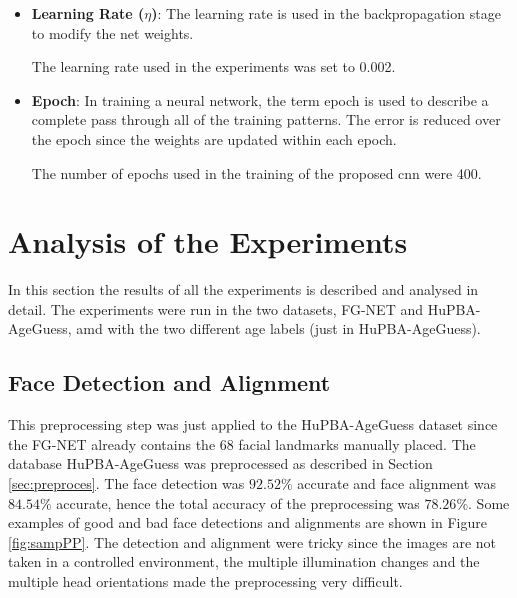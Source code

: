 \begin{itemize}
	\item \textbf{Learning Rate ($\eta $)}: The learning rate is used in the backpropagation stage to modify the net weights.
	
	The learning rate used in the experiments was set to 0.002. 
	
	\item \textbf{Epoch}: In training a neural network, the term epoch is used to describe a complete pass through all of the training patterns. The error is reduced over the epoch since the weights are updated within each epoch.
	
	The number of epochs used in the training of the proposed \gls{cnn} were 400.
\end{itemize}

\section{Analysis of the Experiments}







In this section the results of all the experiments is described and analysed in detail. The experiments were run in the two datasets, FG-NET and HuPBA-AgeGuess, amd with the two different age labels (just in HuPBA-AgeGuess).

\subsection{Face Detection and Alignment}

This preprocessing step was just applied to the HuPBA-AgeGuess dataset since the FG-NET already contains the 68 facial landmarks manually placed. The database HuPBA-AgeGuess was preprocessed as described in Section \ref{sec:preproces}. The face detection was $92.52\%$ accurate and face alignment was $84.54\%$ accurate, hence the total accuracy of the preprocessing was $78.26\%$. Some examples of good and bad face detections and alignments are shown in Figure \ref{fig:sampPP}. The detection and alignment were tricky since the images are not taken in a controlled environment, the multiple illumination changes and the multiple head orientations made the preprocessing very difficult.

